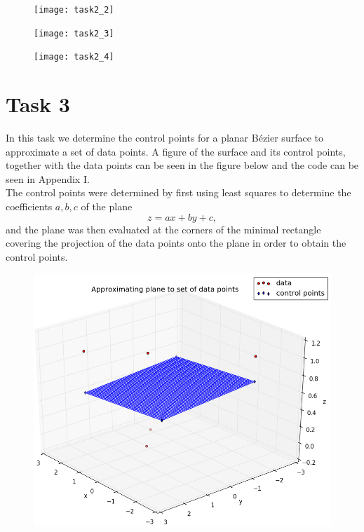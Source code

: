 \documentclass[]{article}
\begin{document}
\begin{figure}[h!]
	\texttt{[image: task2\_2]}
\end{figure}

\begin{figure}[h!]
	\texttt{[image: task2\_3]}
\end{figure}

\begin{figure}[h!]
	\texttt{[image: task2\_4]}
\end{figure}

\newpage
\section*{Task 3}
In this task we determine the control points for a planar B\'{e}zier surface to approximate a set of data points. A figure of the surface and its control points, together with the data points can be seen in the figure below and the code can be seen in Appendix I.\\
The control points were determined by first using least squares to determine the coefficients $a, b, c$ of the plane
\begin{equation*}
z = ax + by + c,
\end{equation*}
and the plane was then evaluated at the corners of the minimal rectangle covering the projection of the data points onto the plane in order to obtain the control points.
\begin{figure}[h!]
	\includegraphics[scale=0.4]{plane}
\end{figure}
\end{document}

